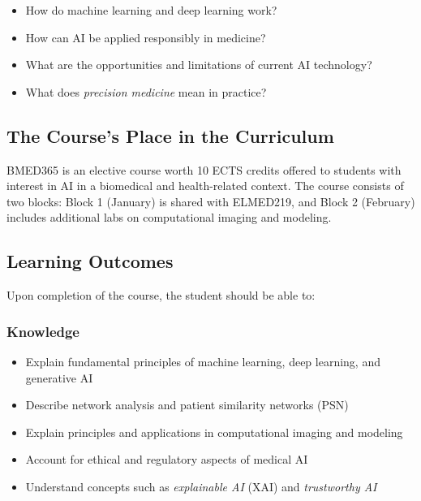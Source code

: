 \documentclass[11pt,a4paper]{article}
\begin{document}
\begin{infobox}
\begin{itemize}[nosep]
    \item How do machine learning and deep learning work?
    \item How can AI be applied responsibly in medicine?
    \item What are the opportunities and limitations of current AI technology?
    \item What does \emph{precision medicine} mean in practice?
\end{itemize}
\end{infobox}

\subsection{The Course's Place in the Curriculum}

BMED365 is an elective course worth 10 ECTS credits offered to students with interest in AI in a biomedical and health-related context. The course consists of two blocks: Block 1 (January) is shared with ELMED219, and Block 2 (February) includes additional labs on computational imaging and modeling.

\subsection{Learning Outcomes}

Upon completion of the course, the student should be able to:

\subsubsection*{Knowledge}
\begin{itemize}[nosep]
    \item Explain fundamental principles of machine learning, deep learning, and generative AI
    \item Describe network analysis and patient similarity networks (PSN)
    \item Explain principles and applications in computational imaging and modeling
    \item Account for ethical and regulatory aspects of medical AI
    \item Understand concepts such as \emph{explainable AI} (XAI) and \emph{trustworthy AI}
\end{itemize}
\end{document}
